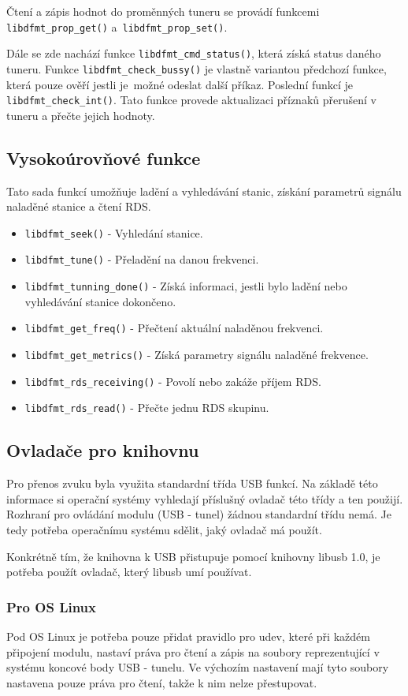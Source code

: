 Čtení a zápis hodnot do proměnných tuneru se provádí funkcemi \verb|libdfmt_prop_get()| a~\verb|libdfmt_prop_set()|.

Dále se zde nachází funkce \verb|libdfmt_cmd_status()|, která získá status daného tuneru. Funkce \verb|libdfmt_check_bussy()| je vlastně variantou předchozí funkce, která pouze ověří jestli je~možné odeslat další příkaz. Poslední funkcí je \verb|libdfmt_check_int()|. Tato funkce provede aktualizaci příznaků přerušení v tuneru a přečte jejich hodnoty.

\subsection{Vysokoúrovňové funkce}
Tato sada funkcí umožňuje ladění a vyhledávání stanic, získání parametrů signálu naladěné stanice a čtení RDS.

\begin{itemize}
\item \verb|libdfmt_seek()| - Vyhledání stanice.
\item \verb|libdfmt_tune()| - Přeladění na danou frekvenci. 
\item \verb|libdfmt_tunning_done()| - Získá informaci, jestli bylo ladění nebo vyhledávání stanice dokončeno.
\item \verb|libdfmt_get_freq()| - Přečtení aktuální naladěnou frekvenci.
\item \verb|libdfmt_get_metrics()| - Získá parametry signálu naladěné frekvence.
\item \verb|libdfmt_rds_receiving()| - Povolí nebo zakáže příjem RDS.
\item \verb|libdfmt_rds_read()| - Přečte jednu RDS skupinu.
\end{itemize}

\subsection{Ovladače pro knihovnu}
Pro přenos zvuku byla využita standardní třída USB funkcí. Na základě této informace si operační systémy vyhledají příslušný ovladač této třídy a ten použijí. Rozhraní pro ovládání modulu (USB - \iic tunel) žádnou standardní třídu nemá. Je tedy potřeba operačnímu systému sdělit, jaký ovladač má použít.

Konkrétně tím, že knihovna k USB přistupuje pomocí knihovny libusb 1.0, je potřeba použít ovladač, který libusb umí používat.

\subsubsection{Pro OS Linux}
Pod OS Linux je potřeba pouze přidat pravidlo pro udev, které při každém připojení modulu, nastaví práva pro čtení a zápis na soubory reprezentující v systému koncové body USB - \iic tunelu. Ve výchozím nastavení mají tyto soubory nastavena pouze práva pro čtení, takže k nim nelze přestupovat.

